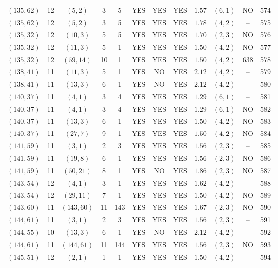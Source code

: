 \begin{longtable}{|c|c|c|c|c|c|c|c|c|c|c|c|}
$(135,62)$ & 12 & $(5,2)$ & 3 & 5 & YES & YES & YES & $1.57$ & $(6,1)$ & NO & 574\\
$(135,62)$ & 12 & $(5,2)$ & 3 & 5 & YES & YES & YES & $1.78$ & $(4,2)$ & -- & 575\\
$(135,32)$ & 12 & $(10,3)$ & 5 & 5 & YES & YES & YES & $1.70$ & $(2,3)$ & NO & 576\\
$(135,32)$ & 12 & $(11,3)$ & 5 & 1 & YES & YES & YES & $1.50$ & $(4,2)$ & NO & 577\\
$(135,32)$ & 12 & $(59,14)$ & 10 & 1 & YES & YES & YES & $1.50$ & $(4,2)$ & 638 & 578\\
$(138,41)$ & 11 & $(11,3)$ & 5 & 1 & YES & NO & YES & $2.12$ & $(4,2)$ & -- & 579\\
$(138,41)$ & 11 & $(13,3)$ & 6 & 1 & YES & NO & YES & $2.12$ & $(4,2)$ & -- & 580\\
$(140,37)$ & 11 & $(4,1)$ & 3 & 4 & YES & YES & YES & $1.29$ & $(6,1)$ & -- & 581\\
$(140,37)$ & 11 & $(4,1)$ & 3 & 4 & YES & YES & YES & $1.29$ & $(6,1)$ & NO & 582\\
$(140,37)$ & 11 & $(13,3)$ & 6 & 1 & YES & YES & YES & $1.50$ & $(4,2)$ & NO & 583\\
$(140,37)$ & 11 & $(27,7)$ & 9 & 1 & YES & YES & YES & $1.50$ & $(4,2)$ & NO & 584\\
$(141,59)$ & 11 & $(3,1)$ & 2 & 3 & YES & YES & YES & $1.56$ & $(2,3)$ & -- & 585\\
$(141,59)$ & 11 & $(19,8)$ & 6 & 1 & YES & YES & YES & $1.56$ & $(2,3)$ & NO & 586\\
$(141,59)$ & 11 & $(50,21)$ & 8 & 1 & YES & NO & YES & $1.86$ & $(2,3)$ & NO & 587\\
$(143,54)$ & 12 & $(4,1)$ & 3 & 1 & YES & YES & YES & $1.62$ & $(4,2)$ & -- & 588\\
$(143,54)$ & 12 & $(29,11)$ & 7 & 1 & YES & YES & YES & $1.50$ & $(4,2)$ & NO & 589\\
$(143,60)$ & 11 & $(143,60)$ & 11 & 143 & YES & YES & YES & $1.67$ & $(2,3)$ & NO & 590\\
$(144,61)$ & 11 & $(3,1)$ & 2 & 3 & YES & YES & YES & $1.56$ & $(2,3)$ & -- & 591\\
$(144,55)$ & 10 & $(13,3)$ & 6 & 1 & YES & NO & YES & $2.12$ & $(4,2)$ & -- & 592\\
$(144,61)$ & 11 & $(144,61)$ & 11 & 144 & YES & YES & YES & $1.56$ & $(2,3)$ & NO & 593\\
$(145,51)$ & 12 & $(2,1)$ & 1 & 1 & YES & YES & YES & $1.50$ & $(4,2)$ & -- & 594\\

\end{longtable}
